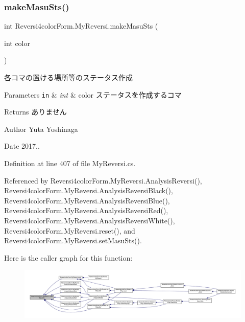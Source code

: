 \subsubsection{\texorpdfstring{make\+Masu\+Sts()}{makeMasuSts()}}
{\footnotesize\ttfamily int Reversi4color\+Form.\+My\+Reversi.\+make\+Masu\+Sts (\begin{DoxyParamCaption}\item[{int}]{color }\end{DoxyParamCaption})\hspace{0.3cm}{\ttfamily [private]}}



各コマの置ける場所等のステータス作成 


\begin{DoxyParams}[1]{Parameters}
\mbox{\tt in}  & {\em int} & color ステータスを作成するコマ \\
\hline
\end{DoxyParams}
\begin{DoxyReturn}{Returns}
ありません 
\end{DoxyReturn}
\begin{DoxyAuthor}{Author}
Yuta Yoshinaga 
\end{DoxyAuthor}
\begin{DoxyDate}{Date}
2017.. 
\end{DoxyDate}


Definition at line 407 of file My\+Reversi.\+cs.



Referenced by Reversi4color\+Form.\+My\+Reversi.\+Analysis\+Reversi(), Reversi4color\+Form.\+My\+Reversi.\+Analysis\+Reversi\+Black(), Reversi4color\+Form.\+My\+Reversi.\+Analysis\+Reversi\+Blue(), Reversi4color\+Form.\+My\+Reversi.\+Analysis\+Reversi\+Red(), Reversi4color\+Form.\+My\+Reversi.\+Analysis\+Reversi\+White(), Reversi4color\+Form.\+My\+Reversi.\+reset(), and Reversi4color\+Form.\+My\+Reversi.\+set\+Masu\+Sts().

Here is the caller graph for this function\+:
\nopagebreak
\begin{figure}[H]
\begin{center}
\leavevmode
\includegraphics[width=350pt]{class_reversi4color_form_1_1_my_reversi_afdfd5f0fc3a4ed4e24bcf67ead0bb980_icgraph}
\end{center}
\end{figure}
\mbox{\label{class_reversi4color_form_1_1_my_reversi_aeb24b855c540f99c901de08b11af1dd6}} 
